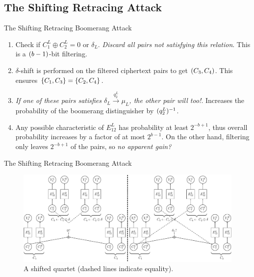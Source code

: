 \documentclass[notheorems]{beamer}
\theoremstyle{definition}
\theoremstyle{example}
\begin{document}
    \subsection{The Shifting Retracing Attack}
    \label{subsec:shift-retr-boomerang}

    \begin{frame}[<+->]{The Shifting Retracing Boomerang Attack}
        \begin{enumerate}
            \item Check if \(C_1^L \oplus C_2^L = 0 \textrm{ or } \delta_L\).
            \emph{Discard all pairs not satisfying this relation}. This is a
            \((b - 1)\)-bit filtering.
            \item \(\delta\)-shift is performed on the filtered ciphertext pairs
            to get \((C_3, C_4)\). This ensures \(\{C_1, C_3\} =
            \{C_2, C_4\}\).
            \item \emph{If one of these pairs satisfies \(\delta_L
            \xrightarrow{q_2^L} \mu_L\), the other pair will too!}. Increases
            the probability of the boomerang distinguisher by
            \((q_2^L)^{-1}\).
            \item Any possible characteristic of \(E_{12}^L\) has probability at
            least \(2^{-b + 1}\), thus overall probability increases by a factor
            of at most \(2^{b - 1}\). On the other hand, filtering only leaves
            \(2^{-b + 1}\) of the pairs, so \emph{no apparent gain?}
        \end{enumerate}
    \end{frame}

    \begin{frame}{The Shifting Retracing Boomerang Attack}
        \begin{figure}
            \centering
            \includegraphics[width=\columnwidth]{images/shifting_boomerang.png}
            \caption{A shifted quartet (dashed lines indicate equality).}
        \end{figure}
    \end{frame}
\end{document}
